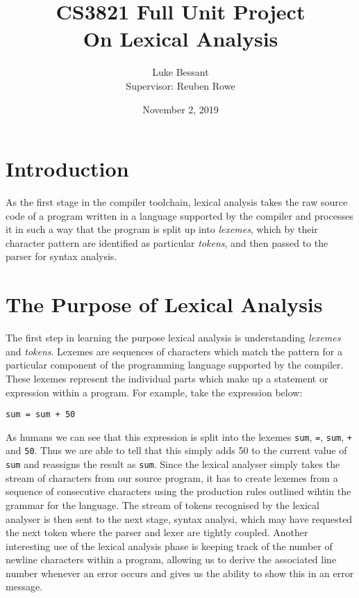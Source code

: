 \documentclass[a4paper, 11pt]{article}
\title{\textbf{CS3821 Full Unit Project}\\On Lexical Analysis}
\author{Luke Bessant\\Supervisor: Reuben Rowe}
\date{November 2, 2019}
\begin{document}
\maketitle
\thispagestyle{title}
\newpage

\tableofcontents
\newpage

\section{Introduction}
As the first stage in the compiler toolchain, lexical analysis takes the raw source code of a program written in a language supported by the compiler and processes it in such a way that the program is split up into \textit{lexemes}, which by their character pattern are identified as particular \textit{tokens}, and then passed to the parser for syntax analysis.

\section{The Purpose of Lexical Analysis}
The first step in learning the purpose lexical analysis is understanding \textit{lexemes} and \textit{tokens}. Lexemes are sequences of characters which match the pattern for a particular component of the programming language supported by the compiler. These lexemes represent the individual parts which make up a statement or expression within a program. For example, take the expression below:

\begin{center}
	\texttt{sum = sum + 50}
\end{center}

As humans we can see that this expression is split into the lexemes \texttt{sum}, \texttt{=}, \texttt{sum}, \texttt{+} and \texttt{50}. Thus we are able to tell that this simply adds 50 to the current value of \texttt{sum} and reassigns the result as \texttt{sum}. Since the lexical analyser simply takes the stream of characters from our source program, it has to create lexemes from a sequence of consecutive characters using the production rules outlined wihtin the grammar for the language. The stream of tokens recognised by the lexical analyser is then sent to the next stage, syntax analysi, which may have requested the next token where the parser and lexer are tightly coupled. Another interesting use of the lexical analysis phase is keeping track of the number of newline characters within a program, allowing us to derive the associated line number whenever an error occurs and gives us the ability to show this in an error message.
\end{document}
